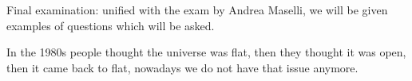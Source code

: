 \documentclass[main.tex]{subfiles}
\begin{document}

Final examination: unified with the exam by Andrea Maselli, 
we will be given examples of questions which will be asked. 

In the 1980s people thought the universe was flat, 
then they thought it was open, 
then it came back to flat, 
nowadays we do not have that issue anymore. 
\end{document}
